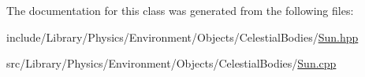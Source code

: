 The documentation for this class was generated from the following files\+:\begin{DoxyCompactItemize}
\item 
include/\+Library/\+Physics/\+Environment/\+Objects/\+Celestial\+Bodies/\hyperlink{_sun_8hpp}{Sun.\+hpp}\item 
src/\+Library/\+Physics/\+Environment/\+Objects/\+Celestial\+Bodies/\hyperlink{_sun_8cpp}{Sun.\+cpp}\end{DoxyCompactItemize}
